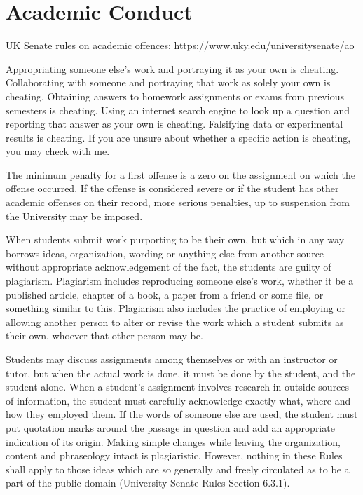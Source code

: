 \documentclass[
  letterpaper,
  DIV=11,
  numbers=noendperiod]{scrartcl}
\begin{document}
\hypertarget{academic-conduct}{%
\section{Academic Conduct}\label{academic-conduct}}

UK Senate rules on academic offences:
\url{https://www.uky.edu/universitysenate/ao}

Appropriating someone else's work and portraying it as your own is
cheating. Collaborating with someone and portraying that work as solely
your own is cheating. Obtaining answers to homework assignments or exams
from previous semesters is cheating. Using an internet search engine to
look up a question and reporting that answer as your own is cheating.
Falsifying data or experimental results is cheating. If you are unsure
about whether a specific action is cheating, you may check with me.

The minimum penalty for a first offense is a zero on the assignment on
which the offense occurred. If the offense is considered severe or if
the student has other academic offenses on their record, more serious
penalties, up to suspension from the University may be imposed.

When students submit work purporting to be their own, but which in any
way borrows ideas, organization, wording or anything else from another
source without appropriate acknowledgement of the fact, the students are
guilty of plagiarism. Plagiarism includes reproducing someone else's
work, whether it be a published article, chapter of a book, a paper from
a friend or some file, or something similar to this. Plagiarism also
includes the practice of employing or allowing another person to alter
or revise the work which a student submits as their own, whoever that
other person may be.

Students may discuss assignments among themselves or with an instructor
or tutor, but when the actual work is done, it must be done by the
student, and the student alone. When a student's assignment involves
research in outside sources of information, the student must carefully
acknowledge exactly what, where and how they employed them. If the words
of someone else are used, the student must put quotation marks around
the passage in question and add an appropriate indication of its origin.
Making simple changes while leaving the organization, content and
phraseology intact is plagiaristic. However, nothing in these Rules
shall apply to those ideas which are so generally and freely circulated
as to be a part of the public domain (University Senate Rules Section
6.3.1).
\end{document}
